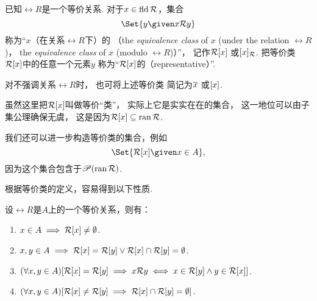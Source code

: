 \begin{definition}
已知\(\rel{R}\)是一个等价关系.
对于\(x \in \operatorname{fld} \mathcal{R}\)，集合\begin{equation*}
	\Set{ y \given x \rel{R} y }
\end{equation*}
称为“\(x\)（在关系\(\rel{R}\)下）的%
（the \emph{equivalence class} of \(x\) (under the relation \(\rel{R}\))，
the \emph{equivalence class} of \(x\) (modulo \(\rel{R}\))）”，
记作\(\EquivalenceClassBH{x}[\rel{R}]\)
或\(\EquivalenceClassBT{x}[\rel{R}]\).
把等价类\(\EquivalenceClassBH{x}[\rel{R}]\)中的任意一个元素\(y\)
称为“\(\EquivalenceClassBH{x}[\rel{R}]\)的（representative）”.

对不强调关系\(\rel{R}\)时，
也可将上述等价类
简记为\(\EquivalenceClassO{x}\)
或\(\EquivalenceClassB{x}\).
\end{definition}

虽然这里把\(\EquivalenceClassBH{x}[\rel{R}]\)叫做等价“类”，
实际上它是实实在在的集合，
这一地位可以由子集公理确保无虞，
这是因为\(\EquivalenceClassBH{x}[\rel{R}] \subseteq \ran \rel{R}\).

我们还可以进一步构造等价类的集合，例如\begin{equation*}
	\Set{ \EquivalenceClassBH{x}[\rel{R}] \given x \in A },
\end{equation*}
因为这个集合包含于\(\mathscr{P}(\operatorname{ran} \mathcal{R})\).

根据等价类的定义，容易得到以下性质.
\begin{property}
设\(\rel{R}\)是\(A\)上的一个等价关系，则有：
\begin{enumerate}
	\item \(x \in A
	\implies \EquivalenceClassBH{x}[\rel{R}] \neq \emptyset\).

	\item \(x,y \in A
	\implies \EquivalenceClassBH{x}[\rel{R}] = \rel{R}[y]
	\lor \EquivalenceClassBH{x}[\rel{R}] \cap \rel{R}[y] = \emptyset\).

	\item \((\forall x,y \in A)
	[
		\EquivalenceClassBH{x}[\rel{R}] = \rel{R}[y]
		\implies
		x \rel{R} y
		\iff
		x \in \rel{R}[y] \land y \in \EquivalenceClassBH{x}[\rel{R}]
	]\).

	\item \((\forall x,y \in A)
	[
		\EquivalenceClassBH{x}[\rel{R}] \neq \rel{R}[y]
		\implies
		\EquivalenceClassBH{x}[\rel{R}] \cap \rel{R}[y] = \emptyset
	]\).
\end{enumerate}
\end{property}

